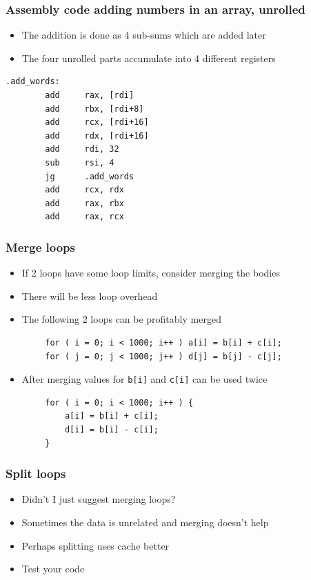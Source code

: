 \documentclass{beamer}
\begin{document}
\begin{frame}[fragile]
    \frametitle{Assembly code adding numbers in an array, unrolled}
    \begin{itemize}
        \item The addition is done as 4 sub-sums which are added later
        \item The four unrolled parts accumulate into 4 different registers
    \end{itemize}
\begin{verbatim}
.add_words:
        add     rax, [rdi]
        add     rbx, [rdi+8]
        add     rcx, [rdi+16]
        add     rdx, [rdi+16]
        add     rdi, 32
        sub     rsi, 4
        jg      .add_words
        add     rcx, rdx
        add     rax, rbx
        add     rax, rcx
\end{verbatim}
\end{frame}

\begin{frame}[fragile]
    \frametitle{Merge loops}
    \begin{itemize}
        \item If 2 loops have some loop limits, consider merging the bodies
        \item There will be less loop overhead
        \item The following 2 loops can be profitably merged
    \end{itemize}
\begin{verbatim}
        for ( i = 0; i < 1000; i++ ) a[i] = b[i] + c[i];
        for ( j = 0; j < 1000; j++ ) d[j] = b[j] - c[j];
\end{verbatim}
    \begin{itemize}
        \item After merging values for {\tt b[i]} and {\tt c[i]} can be used twice
    \end{itemize}

\begin{verbatim}
        for ( i = 0; i < 1000; i++ ) {
            a[i] = b[i] + c[i];
            d[i] = b[i] - c[i];
        }
\end{verbatim}
\end{frame}

\begin{frame}
    \frametitle{Split loops}
    \begin{itemize}
        \item Didn't I just suggest merging loops?
        \item Sometimes the data is unrelated and merging doesn't help
        \item Perhaps splitting uses cache better
        \item Test your code
    \end{itemize}
\end{frame}
\end{document}
